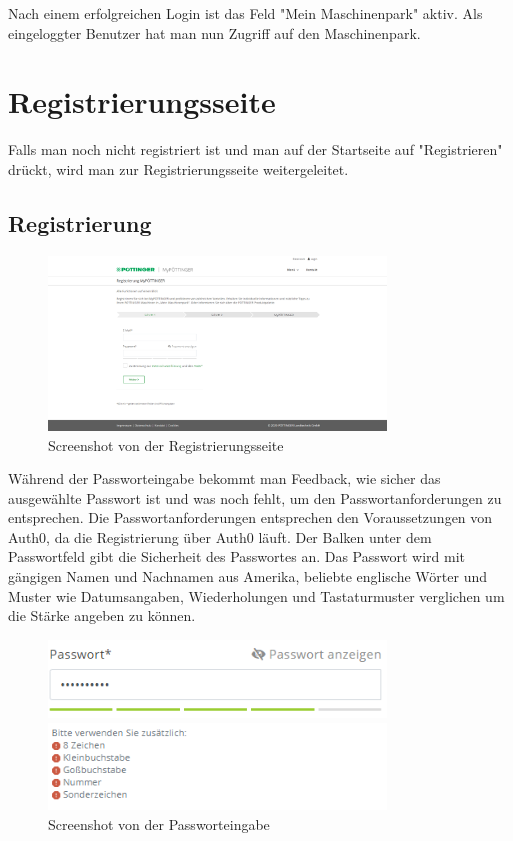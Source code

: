 Nach einem erfolgreichen Login ist das Feld "Mein Maschinenpark" aktiv. Als eingeloggter Benutzer hat man nun Zugriff auf den Maschinenpark. 

\section{Registrierungsseite}

Falls man noch nicht registriert ist und man auf der Startseite auf "Registrieren" drückt, wird man zur Registrierungsseite weitergeleitet.

\subsection{Registrierung}
\begin{figure}[H]
	\centerline{
		\includegraphics[width=0.8\textwidth]{./grafiken/erm_register.png}
	}
	\vskip0pt
	\caption{Screenshot von der Registrierungsseite} \label{fig:register}
\end{figure}

Während der Passworteingabe bekommt man Feedback, wie sicher das ausgewählte Passwort ist und was noch fehlt, um den Passwortanforderungen zu entsprechen. Die Passwortanforderungen entsprechen den Voraussetzungen von Auth0, da die Registrierung über Auth0 läuft. Der Balken unter dem Passwortfeld gibt die Sicherheit des Passwortes an. Das Passwort wird mit gängigen Namen und Nachnamen aus Amerika, beliebte englische Wörter und Muster wie Datumsangaben, Wiederholungen und Tastaturmuster verglichen um die Stärke angeben zu können.

\begin{figure}[H]
	\centerline{
		\includegraphics[width=0.8\textwidth]{./grafiken/passwordSecurity.PNG}
	}
	\vskip0pt
	\centerline{
		\includegraphics[width=0.8\textwidth]{./grafiken/passwordHints.PNG}
	}
	\caption{Screenshot von der Passworteingabe} \label{fig:pw}
\end{figure}

